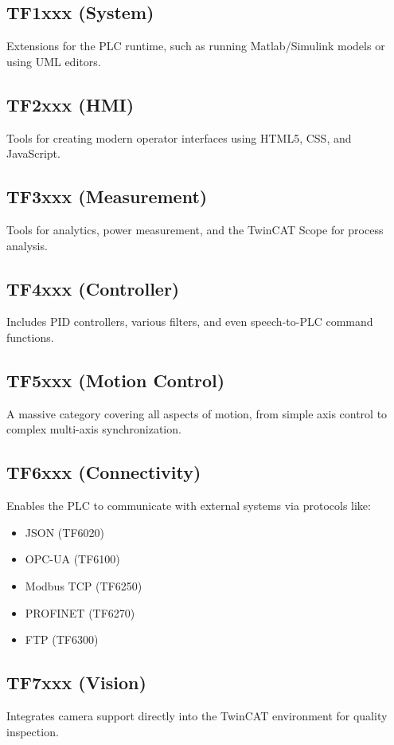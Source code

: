 \documentclass[11pt,a4paper]{article}
\begin{document}
\subsection{TF1xxx (System)}
Extensions for the PLC runtime, such as running Matlab/Simulink models or using UML editors.

\subsection{TF2xxx (HMI)}
Tools for creating modern operator interfaces using HTML5, CSS, and JavaScript.

\subsection{TF3xxx (Measurement)}
Tools for analytics, power measurement, and the TwinCAT Scope for process analysis.

\subsection{TF4xxx (Controller)}
Includes PID controllers, various filters, and even speech-to-PLC command functions.

\subsection{TF5xxx (Motion Control)}
A massive category covering all aspects of motion, from simple axis control to complex multi-axis synchronization.

\subsection{TF6xxx (Connectivity)}
Enables the PLC to communicate with external systems via protocols like:
\begin{itemize}[leftmargin=*]
    \item JSON (TF6020)
    \item OPC-UA (TF6100)
    \item Modbus TCP (TF6250)
    \item PROFINET (TF6270)
    \item FTP (TF6300)
\end{itemize}

\subsection{TF7xxx (Vision)}
Integrates camera support directly into the TwinCAT environment for quality inspection.
\end{document}

